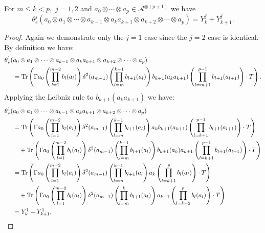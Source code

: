     \begin{lem}\label{kogom app 3}
        For $m\leq k<p,$ $j=1,2$ and $a_0\otimes\cdots\otimes a_p \in \mathcal{A}^{\otimes (p+1)}$ we have
        \begin{equation*}
            \theta_s^j(a_0\otimes a_1\otimes\cdots\otimes a_{k-1}\otimes a_{k}a_{k+1}\otimes a_{k+2}\otimes\cdots\otimes a_p) = Y_k^j+Y_{k+1}^j.
        \end{equation*}
    \end{lem}
    \begin{proof} 
        Again we demonstrate only the $j=1$ case since the $j=2$ case is identical. By definition we have:
        \begin{align*}
            \theta_s^1(&a_0\otimes a_1\otimes\cdots\otimes a_{k-1}\otimes a_{k}a_{k+1}\otimes a_{k+2}\otimes\cdots\otimes a_p)\\
                                &= {\rm Tr}\left(\Gamma a_0\left(\prod_{l=1}^{m-2}b_l(a_l)\right)\delta^2(a_{m-1})\left(\prod_{l=m}^{k-1}b_{l+1}(a_l)\right)b_{k+1}(a_ka_{k+1})\left(\prod_{l=m+1}^{p-1}b_{l+1}(a_{l+1})\right)\cdot T\right).
        \end{align*}
        Applying the Leibniz rule to $b_{k+1}(a_ka_{k+1})$ we have:
        \begin{align*}
        \theta_s^1(&a_0\otimes a_1\otimes\cdots\otimes a_{k-1}\otimes a_{k}a_{k+1}\otimes a_{k+2}\otimes\cdots\otimes a_p)\\
                              &={\rm Tr}\left(\Gamma a_0\left(\prod_{l=1}^{m-2}b_l(a_l)\right)\delta^2(a_{m-1})\left(\prod_{l=m}^{k-1}b_{l+1}(a_l)\right)a_k b_{k+1}(a_{k+1})\left(\prod_{l=k+1}^{p-1}b_{l+1}(a_{l+1})\right)\cdot T\right)\\
                              &\quad+{\rm Tr}\left(\Gamma a_0\left(\prod_{l=1}^{m-2}b_l(a_l)\right)\delta^2(a_{m-1})\left(\prod_{l=m}^{k-1}b_{l+1}(a_l)\right)b_{k+1}(a_k)a_{k+1}\left(\prod_{l=k+1}^{p-1}b_{l+1}(a_{l+1})\right)\cdot T\right)\\
                              &={\rm Tr}\left(\Gamma a_0\left(\prod_{l=1}^{m-2}b_l(a_l)\right)\delta^2(a_{m-1})\left(\prod_{l=m}^{k-1}b_{l+1}(a_l\right) a_k\left(\prod_{l=k+1}^pb_l(a_l)\right)\cdot T\right)\\
                              &\quad+{\rm Tr}\left(\Gamma a_0\left(\prod_{l=1}^{m-2}b_l(a_l)\right)\delta^2(a_{m-1})\left(\prod_{l=m}^kb_{l+1}(a_l)\right) a_{k+1}\left(\prod_{l=k+2}^pb_l(a_l)\right)\cdot T\right)\\
                              &=Y_k^1+Y_{k+1}^1.
        \end{align*}
    \end{proof}
    
